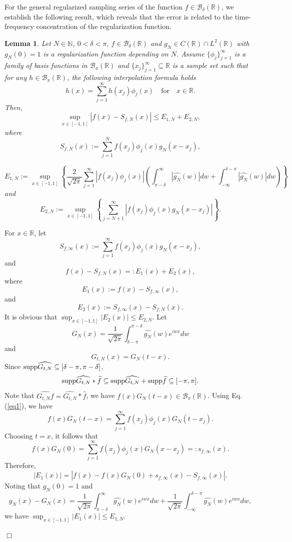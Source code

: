 \documentclass[a4paper]{article}
\newtheorem{lemma}[theorem]{\bf Lemma}
\newenvironment{proof}{\noindent{\em Proof:}}{\quad \hfill$\Box$\vspace{2ex}}
\numberwithin{equation}{section}
\begin{document}
For the general regularized sampling series of the function  $f\in \mathcal{B}_{\delta}(\mathbb{R})$, we establish the following result, which reveals that the error is related to the time-frequency concentration of the regularization function.

\begin{lemma}\label{L11}
Let $ N\in \mathbb{N}$, $0<\delta<\pi$, $f\in \mathcal{B}_{\delta}(\mathbb{R})$ and $g_{N}\in C(\mathbb{R})\cap L^{2}(\mathbb{R})$ with $g_{N}(0)=1$ is a regularization function depending on $N$.
Assume $\{\phi_{j}\}_{j=1}^{\infty}$ is a family of basis functions in $\mathcal{B}_{\pi}(\mathbb{R})$ and $\{x_{j}\}_{j=1}^{\infty}\subseteq\mathbb{R}$ is a sample set such that for any $h\in \mathcal{B}_{\pi}(\mathbb{R})$,  the following  interpolation formula holds \begin{equation}\label{eq1}h(x)=\sum_{j=1}^{\infty}h(x_{j})\phi_{j}(x)  \quad\text{for}\quad x\in\mathbb{R}.\end{equation}  
Then, 
$$\sup_{x\in [-1,1]}|f(x) - S_{f,N}(x)|\le E_{1,N}+E_{2,N},$$
where \begin{equation}\label{eqsfn}S_{f,N}(x):=\sum_{j=1}^{N}f(x_{j})\phi_{j}(x)g_{N}(x-x_{j}),\end{equation}

$$E_{1,N}:=\sup_{x\in [-1,1]}\left\{ \frac{2}{\sqrt{2\pi}}\sum_{j=1}^{\infty}|f(x_j)\phi_{j}(x)|\left(\int_{\pi-\delta}^{\infty}|\widehat{g_{N}}(w)|dw+ \int_{-\infty}^{\delta-\pi}|\widehat{g_{N}}(w)|dw\right)\right\}$$ and $$E_{2,N}:=\sup_{x\in [-1,1]}\left\{ \sum_{j=N+1}^{\infty}|f(x_j)\phi_{j}(x)g_{N}(x-x_{j})| \right\}.$$
\end{lemma}

\begin{proof}
For $x\in \mathbb{R}$, let  $$S_{f,\infty}(x):=\sum_{j=1}^{\infty}f(x_{j})\phi_{j}(x)g_{N}(x-x_{j}),$$
and 
$$f(x) - S_{f,N}(x)=:E_{1}(x)+E_{2}(x),$$
where $$E_{1}(x):= f(x)-S_{f,\infty}(x),$$ and $$E_{2}(x):= S_{f,\infty}(x)-S_{f,N}(x).$$
It is obvious that
$\sup_{x\in[-1,1]}|E_{2}(x)|\le E_{2,N}$.
Let $$G_{N}(x)=\frac{1}{\sqrt{2\pi}}\int_{\delta-\pi}^{\pi-\delta}\widehat{g_N}(w)e^{iwx}dw$$ and $$G_{t,N}(x)=G_{N}(t-x).$$ Since ${\rm supp} \widehat{G_{t,N}} \subseteq [\delta-\pi,\pi-\delta] $, $${\rm supp}\widehat{G_{t,N}}*\widehat{f} \subseteq {\rm supp}\widehat{G_{t,N}}+ {\rm supp}\widehat{f} \subseteq[-\pi,\pi].$$ Note that $\widehat{G_{t,N}f}=\widehat{G_{t,N}}*\widehat{f} $,  we have $f(x)G_{N}(t-x)\in  \mathcal{B}_{\pi}(\mathbb{R})$. Using Eq.(\ref{eq1}), we have 
$$f(x)G_{N}(t-x)=\sum_{j=1}^{\infty}f(x_{j})\phi_{j}(x)G_{N}(t-x_{j}).$$
Choosing $t=x$, it follows that
$$f(x)G_{N}(0)=\sum_{j=1}^{\infty}f(x_{j})\phi_{j}(x)G_{N}(x-x_{j})=:s_{f,\infty}(x).$$ Therefore,
$$|E_{1}(x)|=|f(x)-f(x)G_{N}(0)+s_{f,\infty}(x)-S_{f,\infty}(x)|.$$
Noting that $g_{N}(0)=1$ and 
$$g_{N}(x)-G_{N}(x)=\frac{1}{\sqrt{2\pi}}\int_{\pi-\delta}^{\infty}\widehat{g_{N}}(w)e^{iwx}dw+\frac{1}{\sqrt{2\pi}}\int_{-\infty}^{\delta-\pi}\widehat{g_{N}}(w)e^{iwx}dw,$$
we have $\sup_{x\in[-1,1]}|E_{1}(x)|\le E_{1,N}$. 


\end{proof}
\end{document}
